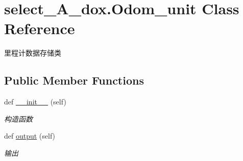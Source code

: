 \hypertarget{classselect___a__dox_1_1_odom__unit}{}\section{select\+\_\+\+A\+\_\+dox.\+Odom\+\_\+unit Class Reference}
\label{classselect___a__dox_1_1_odom__unit}


里程计数据存储类  


\subsection*{Public Member Functions}
\begin{DoxyCompactItemize}
\item 
def \hyperlink{classselect___a__dox_1_1_odom__unit_a49c773e3b8285f9e34bd76650e467560}{\+\_\+\+\_\+init\+\_\+\+\_\+} (self)
\begin{DoxyCompactList}\small\item\em 构造函数 \end{DoxyCompactList}\item 
def \hyperlink{classselect___a__dox_1_1_odom__unit_aae71c1d0731f7d23c8c41c4859831f0b}{output} (self)
\begin{DoxyCompactList}\small\item\em 输出 \end{DoxyCompactList}\end{DoxyCompactItemize}
